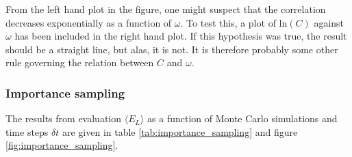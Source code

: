 From the left hand plot in the figure, one might suspect that the correlation decreases exponentially as a function of $\omega$. 
To test this, a plot of $\textrm{ln}(C)$ against $\omega$ has been included in the right hand plot. 
If this hypothesis was true, the result should be a straight line, but alas, it is not. 
It is therefore probably some other rule governing the relation between $C$ and $\omega$. 





\subsubsection{Importance sampling} \label{sec:res_importance_sampling}

The results from evaluation $\langle E_L \rangle$ as a function of Monte Carlo simulations and time steps $\delta t$ are given in table \ref{tab:importance_sampling} and figure \ref{fig:importance_sampling}.

